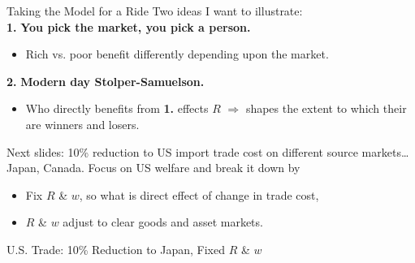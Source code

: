 \documentclass[9pt,pdftex,aspectratio=1610]{beamer}
\theoremstyle{definition}
\begin{document}

\begin{frame}[t]{Taking the Model for a Ride}
\smallskip
Two ideas I want to illustrate:\\
\medskip
\textbf{1.} \textbf{You pick the market, you pick a person.}
\begin{itemize}
  \item Rich vs. poor benefit differently depending upon the market.
\end{itemize}
\bigskip
\textbf{2.} \textbf{Modern day Stolper-Samuelson.}
\begin{itemize}
\item Who directly benefits from \textbf{1.} effects $R$ $\Rightarrow$ shapes the extent to which their are winners and losers.
\end{itemize}
\bigskip
Next slides: 10\% reduction to US import trade cost on different source markets\ldots Japan, Canada. Focus on US welfare and break it down by
\begin{itemize}
\item[A.] Fix $R$ \& $w$, so what is direct effect of change in trade cost,
\smallskip
\item[B.] $R$ \& $w$ adjust to clear goods and asset markets.
\end{itemize}
\end{frame}


\begin{frame}[t]{U.S. Trade: 10\% Reduction to Japan, {\color{red} Fixed $R$ \& $w$} }
\begin{figure}[t]
\end{figure}
\end{frame}
\end{document}
